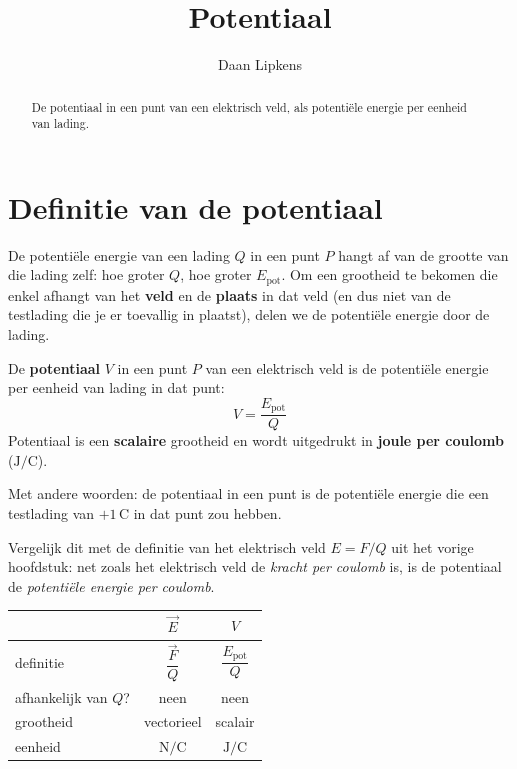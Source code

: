 \documentclass{ximera}
\title{Potentiaal}
\author{Daan Lipkens}
\begin{document}
\begin{abstract}
    De potentiaal in een punt van een elektrisch veld, als potentiële energie per eenheid van lading.
\end{abstract}
\maketitle

\section{Definitie van de potentiaal}
De potentiële energie van een lading $Q$ in een punt $P$ hangt af van de grootte van die lading zelf: hoe groter $Q$, hoe groter $E_{\text{pot}}$. Om een grootheid te bekomen die enkel afhangt van het \textbf{veld} en de \textbf{plaats} in dat veld (en dus niet van de testlading die je er toevallig in plaatst), delen we de potentiële energie door de lading.

\begin{definition}[foldable=true,title={Potentiaal}]\nl
De \textbf{potentiaal} $V$ in een punt $P$ van een elektrisch veld is de potentiële energie per eenheid van lading in dat punt:
\begin{equation}\label{eq:potentiaal_definitie}
    V = \frac{E_{\text{pot}}}{Q}
\end{equation}
Potentiaal is een \textbf{scalaire} grootheid en wordt uitgedrukt in \textbf{joule per coulomb} ($\mathrm{J/C}$).
\end{definition}

Met andere woorden: de potentiaal in een punt is de potentiële energie die een testlading van $+1 \, \mathrm{C}$ in dat punt zou hebben.

\begin{remark}[expandable=true,title={Analogie met het elektrisch veld}]\nl
Vergelijk dit met de definitie van het elektrisch veld $E = F/Q$ uit het vorige hoofdstuk: net zoals het elektrisch veld de \emph{kracht per coulomb} is, is de potentiaal de \emph{potentiële energie per coulomb}.
\begin{center}
\begin{tabular}{lcc}
    & $\vec{E}$ & $V$ \\ \hline
    definitie & $\dfrac{\vec{F}}{Q}$ & $\dfrac{E_{\text{pot}}}{Q}$ \\
    afhankelijk van $Q$? & neen & neen \\
    grootheid & vectorieel & scalair \\
    eenheid & $\mathrm{N/C}$ & $\mathrm{J/C}$
\end{tabular}
\end{center}
\end{remark}
\end{document}

